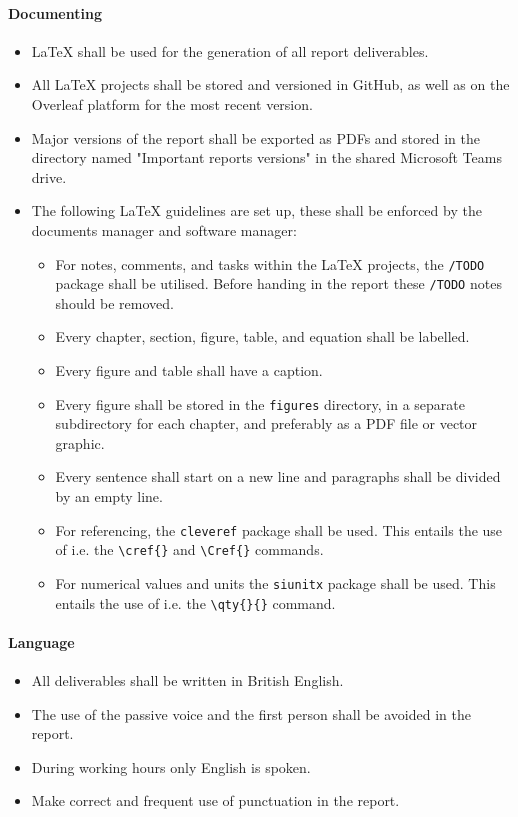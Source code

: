 \paragraph{Documenting}
\begin{itemize}
    \item LaTeX shall be used for the generation of all report deliverables.
    \item All LaTeX projects shall be stored and versioned in GitHub, as well as on the Overleaf platform for the most recent version.
    \item Major versions of the report shall be exported as PDFs and stored in the directory named "Important reports versions" in the shared Microsoft Teams drive.
    \item The following LaTeX guidelines are set up, these shall be enforced by the documents manager and software manager:
    \begin{itemize}
        \item For notes, comments, and tasks within the LaTeX projects, the \verb|/TODO| package shall be utilised.
        Before handing in the report these \verb|/TODO| notes should be removed.
        \item Every chapter, section, figure, table, and equation shall be labelled.
        \item Every figure and table shall have a caption.
        \item Every figure shall be stored in the \verb|figures| directory, in a separate subdirectory for each chapter, and preferably as a PDF file or vector graphic.
        \item Every sentence shall start on a new line and paragraphs shall be divided by an empty line.
        \item For referencing, the \verb|cleveref| package shall be used.
        This entails the use of i.e\@. the \verb|\cref{}| and \verb|\Cref{}| commands.
        \item For numerical values and units the \verb|siunitx| package shall be used.
        This entails the use of i.e\@. the \verb|\qty{}{}| command.
    \end{itemize}
\end{itemize}

\paragraph{Language}
\begin{itemize}
    \item All deliverables shall be written in British English.
    \item The use of the passive voice and the first person shall be avoided in the report.
    \item During working hours only English is spoken.
    \item Make correct and frequent use of punctuation in the report.
\end{itemize}

